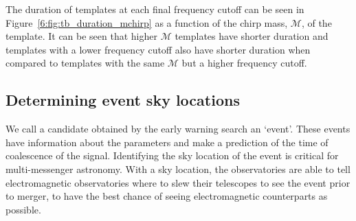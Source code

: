 %
The duration of templates at each final frequency cutoff can be seen in Figure~\ref{6:fig:tb_duration_mchirp} as a function of the chirp mass, $\mathcal{M}$, of the template. It can be seen that higher $\mathcal{M}$ templates have shorter duration and templates with a lower frequency cutoff also have shorter duration when compared to templates with the same $\mathcal{M}$ but a higher frequency cutoff.

\subsection{\label{6:sec:event-localisation}Determining event sky locations}


We call a \gwadj candidate obtained by the early warning search an `event'. These events have information about the \gwadj parameters and make a prediction of the time of coalescence of the \gwadj signal. Identifying the sky location of the event is critical for multi-messenger astronomy. With a sky location, the \gwadj observatories are able to tell electromagnetic observatories where to slew their telescopes to see the event prior to merger, to have the best chance of seeing electromagnetic counterparts as possible.

